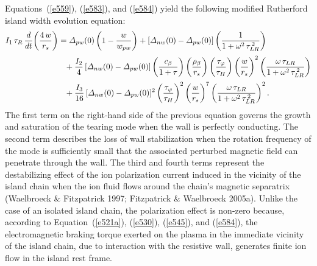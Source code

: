 \documentclass[notitlepage,12pt]{article}
\begin{document}
Equations~(\ref{e559}), (\ref{e583}), and (\ref{e584}) yield the following modified Rutherford island width evolution equation: 
\begin{align}\label{e586}
I_1\,\tau_R\,\frac{d}{dt}\!\left(\frac{4\,w}{r_s}\right) &= {\mit\Delta}_{pw}(0)\left(1-\frac{w}{w_{pw}}\right) + [{\mit\Delta}_{nw}(0)-{\mit\Delta}_{pw}(0)]\left(\frac{1}{1+\omega^2\,\tau_{LR}^{\,2}}\right)\nonumber\\[0.5ex]
&\phantom{=} +\frac{I_2}{4}\,[{\mit\Delta}_{nw}(0)-{\mit\Delta}_{pw}(0)]\left(\frac{c_\beta}{1+\tau}\right)\left(\frac{\rho_\beta}{r_s}\right)
\left(\frac{\tau_\varphi}{\tau_H}\right)\left(\frac{w}{r_s}\right)^2\left(\frac{\omega\,\tau_{LR}}{1+\omega^2\,\tau_{LR}^{\,2}}\right)\nonumber\\[0.5ex]&\phantom{=}+\frac{I_3}{16}\,[{\mit\Delta}_{nw}(0)-{\mit\Delta}_{pw}(0)]^2\left(\frac{\tau_\varphi}{\tau_H}\right)^2\left(\frac{w}{r_s}\right)^7\left(\frac{\omega\,\tau_{LR}}{1+\omega^2\,\tau_{LR}^{\,2}}\right)^2.
\end{align}
The first term on the right-hand side of the previous equation governs the growth and saturation of the tearing mode when the wall
is perfectly conducting. The second term describes  the loss of wall
stabilization when the rotation frequency of the mode is sufficiently small that the associated perturbed magnetic field  can penetrate through the wall.  The third and fourth terms represent the destabilizing effect of the ion polarization
current induced in the vicinity of the island chain when the ion fluid flows around the chain's magnetic separatrix (Waelbroeck \& Fitzpatrick 1997; Fitzpatrick \& Waelbroeck 2005a). Unlike the case of an isolated island chain, the polarization effect
is non-zero because, according to Equation~(\ref{e521a}), (\ref{e530}), (\ref{e545}), and (\ref{e584}), the electromagnetic
braking torque exerted on the plasma in the immediate vicinity of the island chain, due to interaction with the resistive wall, 
generates finite ion flow in the island rest frame. 
\end{document}
